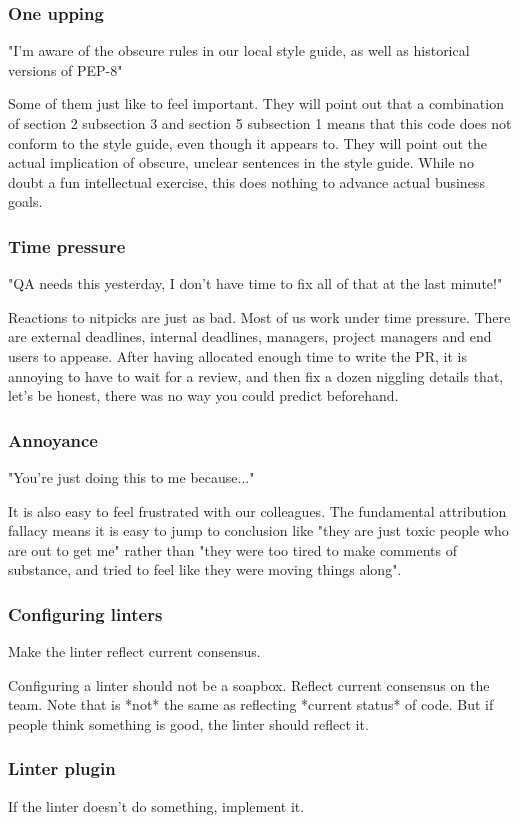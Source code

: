 \begin{frame}
\frametitle{One upping}
"I'm aware of the obscure rules in our local style guide,
as well as historical versions of PEP-8"
\end{frame}

Some of them just like to feel important.
They will point out that a combination of section 2 subsection 3
and section 5 subsection 1 means that this code does not
conform to the style guide,
even though it appears to.
They will point out the actual implication
of obscure,
unclear
sentences in the style guide.
While no doubt a fun intellectual exercise,
this does nothing to advance actual business goals.

\begin{frame}
\frametitle{Time pressure}
"QA needs this yesterday,
I don't have time to fix all of that at the last minute!"
\end{frame}

Reactions to nitpicks are just as bad.
Most of us work under time pressure.
There are external deadlines,
internal deadlines,
managers,
project managers
and end users to appease.
After having allocated enough time to write the PR,
it is annoying to have to wait for a review,
and then fix a dozen niggling details that,
let's be honest,
there was no way you could predict beforehand.

\begin{frame}
\frametitle{Annoyance}
"You're just doing this to me because..."
\end{frame}

It is also easy to feel frustrated with our colleagues.
The fundamental attribution fallacy means it is easy 
to jump to conclusion like
"they are just toxic people who are out to get me"
rather than
"they were too tired to make comments of substance,
and tried to feel like they were moving things along".

\begin{frame}
\frametitle{Configuring linters}
Make the linter reflect current consensus.
\end{frame}

Configuring a linter should not be a soapbox.
Reflect current consensus on the team.
Note that is *not* the same as
reflecting *current status* of code.
But if people think something is good,
the linter should reflect it.

\begin{frame}
\frametitle{Linter plugin}
If the linter doesn't do something,
implement it.
\end{frame}

